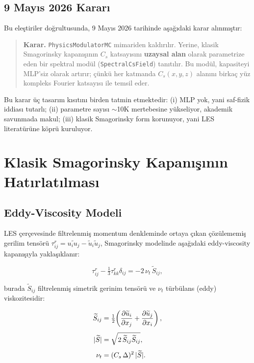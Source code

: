 \subsection{9 Mayıs 2026 Kararı}

Bu eleştiriler doğrultusunda, 9 Mayıs 2026 tarihinde aşağıdaki karar
alınmıştır:

\begin{quote}
\textbf{Karar.} \texttt{PhysicsModulatorMC} mimariden kaldırılır. Yerine,
klasik Smagorinsky kapanışının $C_s$ katsayısını \textbf{uzaysal alan}
olarak parametrize eden bir spektral modül (\texttt{SpectralCsField})
tanıtılır. Bu modül, kapasiteyi MLP'siz olarak artırır; çünkü her
katmanda $C_s(x,y,z)$ alanını birkaç yüz kompleks Fourier katsayısı ile
temsil eder.
\end{quote}

Bu karar üç tasarım kısıtını birden tatmin etmektedir: (i) MLP yok,
yani saf-fizik iddiası tutarlı; (ii) parametre sayısı $\sim$10K
mertebesine yükseliyor, akademik savunmada makul; (iii) klasik
Smagorinsky form korunuyor, yani LES literatürüne köprü kuruluyor.

\section{Klasik Smagorinsky Kapanışının Hatırlatılması}
\label{sec:smagorinsky-recap}

\subsection{Eddy-Viscosity Modeli}

LES çerçevesinde filtrelenmiş momentum denkleminde ortaya çıkan
çözülememiş gerilim tensörü $\tau_{ij}^{r} = \widetilde{u_i u_j} -
\widetilde{u}_i\widetilde{u}_j$, Smagorinsky modelinde aşağıdaki
eddy-viscosity kapanışıyla yaklaşıklanır:

\begin{equation}
  \tau_{ij}^{r} - \tfrac{1}{3}\tau_{kk}^{r}\delta_{ij} = -2\,\nu_t\,\widetilde{S}_{ij},
  \label{eq:smag-stress}
\end{equation}

\noindent burada $\widetilde{S}_{ij}$ filtrelenmiş simetrik gerinim tensörü ve
$\nu_t$ türbülans (eddy) viskozitesidir:

\begin{align}
  \widetilde{S}_{ij} &= \tfrac{1}{2}\!\left(\frac{\partial \widetilde{u}_i}{\partial x_j} +
                       \frac{\partial \widetilde{u}_j}{\partial x_i}\right), \\[4pt]
  |\widetilde{S}|    &= \sqrt{2\,\widetilde{S}_{ij}\widetilde{S}_{ij}}, \\[4pt]
  \nu_t              &= (C_s\,\Delta)^{2}\,|\widetilde{S}|.
  \label{eq:smag-nu_t}
\end{align}

